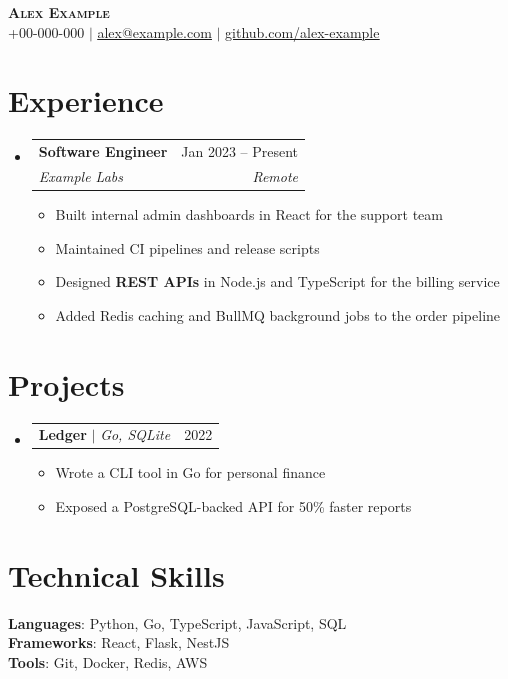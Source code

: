 \documentclass[letterpaper,11pt]{article}
\makeatletter
\newcommand{\resumeItem}[1]{\item\small{{#1 \vspace{-2pt}}}}
\newcommand{\resumeSubheading}[4]{
  \vspace{-2pt}\item
    \begin{tabular*}{0.97\textwidth}[t]{l@{\extracolsep{\fill}}r}
      \textbf{#1} & #2 \\
      \textit{\small#3} & \textit{\small #4} \\
    \end{tabular*}\vspace{-7pt}
}
\newcommand{\resumeProjectHeading}[2]{
    \item
    \begin{tabular*}{0.97\textwidth}{l@{\extracolsep{\fill}}r}
      \small#1 & #2 \\
    \end{tabular*}\vspace{-7pt}
}
\newcommand{\resumeSubHeadingListStart}{\begin{itemize}[leftmargin=0.15in, label={}]}
\newcommand{\resumeSubHeadingListEnd}{\end{itemize}}
\newcommand{\resumeItemListStart}{\begin{itemize}}
\newcommand{\resumeItemListEnd}{\end{itemize}\vspace{-5pt}}
\makeatother
\begin{document}
\begin{center}
    \textbf{\Huge \scshape Alex Example} \\ \vspace{1pt}
    \small +00-000-000 $|$ \href{mailto:alex@example.com}{\underline{alex@example.com}} $|$
    \href{https://github.com/alex-example}{\underline{github.com/alex-example}}
\end{center}

\section{Experience}
  \resumeSubHeadingListStart
    \resumeSubheading
      {Software Engineer}{Jan 2023 -- Present}
      {Example Labs}{Remote}
      \resumeItemListStart
        \resumeItem{Built internal admin dashboards in React for the support team}
        \resumeItem{Maintained CI pipelines and release scripts}
        \resumeItem{Designed \textbf{REST APIs} in Node.js and TypeScript for the billing service}
        \resumeItem{Added Redis caching and BullMQ background jobs to the order pipeline} %
      \resumeItemListEnd
  \resumeSubHeadingListEnd

\section{Projects}
    \resumeSubHeadingListStart
      \resumeProjectHeading
          {\textbf{Ledger} $|$ \emph{Go, SQLite}}{2022}
          \resumeItemListStart
            \resumeItem{Wrote a CLI tool in Go for personal finance}
            \resumeItem{Exposed a PostgreSQL-backed API for 50\% faster reports}
          \resumeItemListEnd
    \resumeSubHeadingListEnd

\section{Technical Skills}
 \begin{itemize}[leftmargin=0.15in, label={}]
    \small{\item{
     \textbf{Languages}{: Python, Go, TypeScript, JavaScript, SQL} \\
     \textbf{Frameworks}{: React, Flask, NestJS} \\
     \textbf{Tools}{: Git, Docker, Redis, AWS}
    }}
 \end{itemize}
\end{document}
